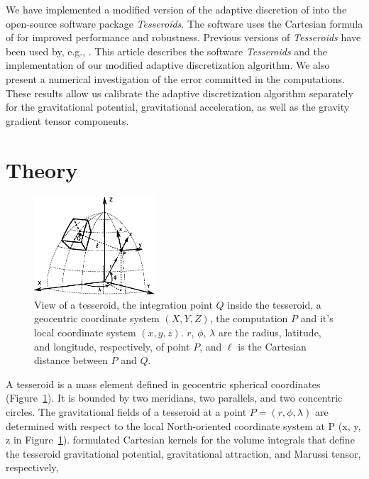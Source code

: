 \documentclass[paper,twocolumn]{geophysics}
\begin{document}
We have implemented a modified version of the adaptive discretion of
\citet{Li2011} into the open-source software package \textit{Tesseroids}.
The software uses the Cartesian formula of \citet{Grombein2013} for improved
performance and robustness.
Previous versions of \textit{Tesseroids} have been used by, e.g.,
\citet{Alvarez2012, Bouman2013, Bouman2013a, Mariani2013, Braitenberg2014,
Braitenberg2011, Fullea2014}.
This article describes the software \textit{Tesseroids} and the implementation
of our modified adaptive discretization algorithm.
We also present a numerical investigation of the error committed
in the computations.
These results allow us calibrate the adaptive discretization algorithm
separately for the gravitational potential, gravitational acceleration,
as well as the gravity gradient tensor components.


\section{Theory}


\begin{figure}
    \centering
    \includegraphics[width=0.4\textwidth]{figs/tesseroid}
    \caption{
        View of a tesseroid,
        the integration point $Q$ inside the tesseroid,
        a geocentric coordinate system $(X, Y, Z)$,
        the computation $P$ and it's local coordinate system $(x, y, z)$.
        $r$, $\phi$, $\lambda$ are
        the radius, latitude, and longitude, respectively, of point $P$,
        and $\ell$ is the Cartesian distance between $P$ and $Q$.
    }
    \label{fig:tesseroid}
\end{figure}

A tesseroid is a mass element defined in geocentric spherical
coordinates
(Figure~\ref{fig:tesseroid}).
It is bounded by two meridians, two parallels, and two concentric circles.
The gravitational fields of a tesseroid at a point $P = (r,\phi,\lambda)$
are determined with respect to the local North-oriented coordinate system at
P (x, y, z in Figure~\ref{fig:tesseroid}).
\citet{Grombein2013} formulated Cartesian kernels for the volume integrals
that define the tesseroid gravitational potential, gravitational attraction,
and Marussi tensor, respectively,
\end{document}
